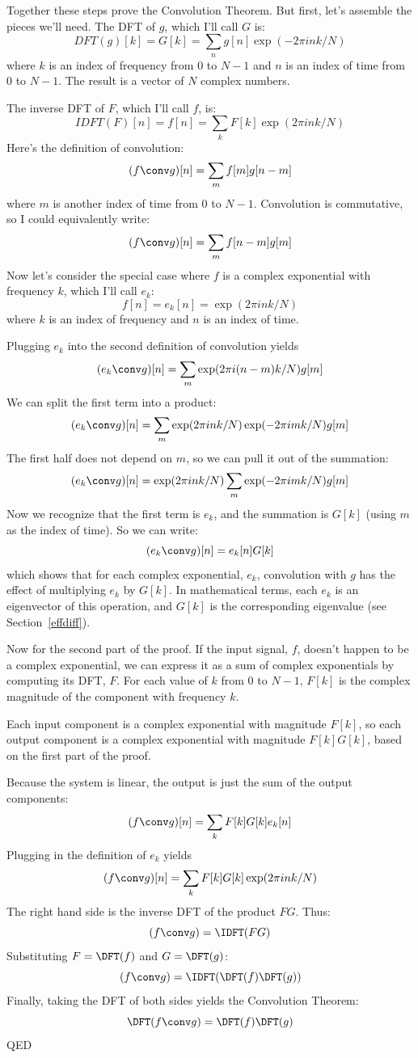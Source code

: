 \documentclass[12pt]{book}
\begin{document}
Together these steps prove the Convolution Theorem.  But first, let's
assemble the pieces we'll need.  The DFT of $g$, which I'll call $G$
is:
%
\[ DFT(g)[k] = G[k] = \sum_n g[n] \exp(-2 \pi i n k / N) \]
%
where $k$ is an index of frequency from
0 to $N-1$ and $n$ is an index of time from 0 to $N-1$.
The result is a vector of $N$ complex numbers.

The inverse DFT of $F$, which I'll call $f$, is:
%
\[ IDFT(F)[n] = f[n] = \sum_k F[k] \exp(2 \pi i n k / N) \]
%
Here's the definition of convolution:
%
\[ (f \conv g)[n] = \sum_m f[m] g[n-m] \]
%
where $m$ is another index of time from 0 to $N-1$.
Convolution is commutative, so I could equivalently write:
%
\[ (f \conv g)[n] = \sum_m f[n-m] g[m] \]
%
Now let's consider the special case where $f$ is a complex
exponential with frequency $k$, which I'll call $e_k$:
%
\[ f[n] = e_k[n] = \exp(2 \pi i n k / N) \]
%
where $k$ is an index of frequency and $n$ is an index of time.

Plugging $e_k$ into the second definition of convolution yields
%
\[ (e_k \conv g)[n] = \sum_m \exp(2 \pi i (n-m) k / N) g[m]  \]
%
We can split the first term into a product:
%
\[ (e_k \conv g)[n] = \sum_m \exp(2 \pi i n k / N) \exp(-2 \pi i m k / N) g[m]  \]
%
The first half does not depend on $m$, so we can pull it out of the
summation:
%
\[ (e_k \conv g)[n] = \exp(2 \pi i n k / N) \sum_m \exp(-2 \pi i m k / N) g[m]  \]
%
Now we recognize that the first term is $e_k$, and the summation is
$G[k]$ (using $m$ as the index of time).  So we can write:
%
\[ (e_k \conv g)[n] = e_k[n] G[k] \]
%
which shows that for each complex exponential, $e_k$, convolution
with $g$ has the effect of multiplying $e_k$ by $G[k]$.  In mathematical
terms, each $e_k$ is an eigenvector of this operation, and
$G[k]$ is the corresponding eigenvalue (see Section~\ref{effdiff}).

Now for the second part of the proof.  If the input signal, $f$, doesn't
happen to be a complex exponential, we can express it as a sum of
complex exponentials by computing its DFT, $F$.
For each value of $k$ from 0 to $N-1$, $F[k]$ is the complex
magnitude of the component with frequency $k$.

Each input component is a complex exponential with magnitude
$F[k]$, so each output component is a complex
exponential with magnitude $F[k] G[k]$, based on the first part of
the proof.

Because the system is linear, the output is just the sum of the
output components:
%
\[ (f \conv g)[n] = \sum_k F[k] G[k] e_k[n] \]
%
Plugging in the definition of $e_k$ yields
%
\[ (f \conv g)[n] = \sum_k F[k] G[k] \exp(2 \pi i n k / N) \]
%
The right hand side is the inverse DFT of the product $F G$.  Thus:
%
\[ (f \conv g) = \IDFT( F G ) \]
%
Substituting $F = \DFT(f)$ and $G = \DFT(g)$:
%
\[ (f \conv g) = \IDFT( \DFT(f) \DFT(g) ) \]
%
Finally, taking the DFT of both sides yields the Convolution Theorem:
%
\[ \DFT(f \conv g) = \DFT(f) \DFT(g) \]
%
QED
\end{document}
